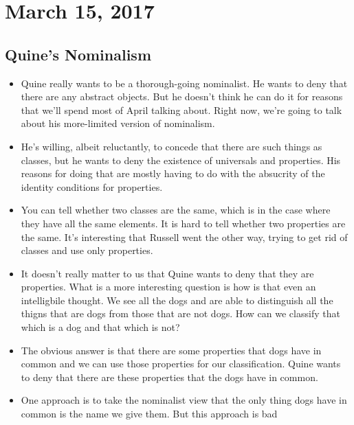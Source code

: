 \documentclass[12pt]{article}
\theoremstyle{definition}
\begin{document}
\begin{itemize}
\end{itemize}

\section{March 15, 2017}

\subsection{Quine's Nominalism}

\begin{itemize}
    \itemsep0em 
    \item 
        Quine really wants to be a thorough-going nominalist. He wants to deny
        that there are any abstract objects. But he doesn't think he can do it
        for reasons that we'll spend most of April talking about. Right now,
        we're going to talk about his more-limited version of nominalism. 
    \item
        He's willing, albeit reluctantly, to concede that there are such things
        as classes, but he wants to deny the existence of universals and
        properties. His reasons for doing that are mostly having to do with the
        absucrity of the identity conditions for properties.
    \item
        You can tell whether two classes are the same, which is in the case
        where they have all the same elements. It is hard to tell whether two
        properties are the same. It's interesting that Russell went the other
        way, trying to get rid of classes and use only properties.
    \item
        It doesn't really matter to us that Quine wants to deny that they are
        properties. What is a more interesting question is how is that even an
        intelligbile thought. We see all the dogs and are able to distinguish
        all the thigns that are dogs from those that are not dogs. How can we
        classify that which is a dog and that which is not? 
    \item
        The obvious answer is that there are some properties that dogs have in
        common and we can use those properties for our classification. Quine
        wants to deny that there are these properties that the dogs have in
        common. 
    \item
        One approach is to take the nominalist view that the only thing dogs
        have in common is the name we give them. But this approach is bad

\end{itemize}
\end{document}
